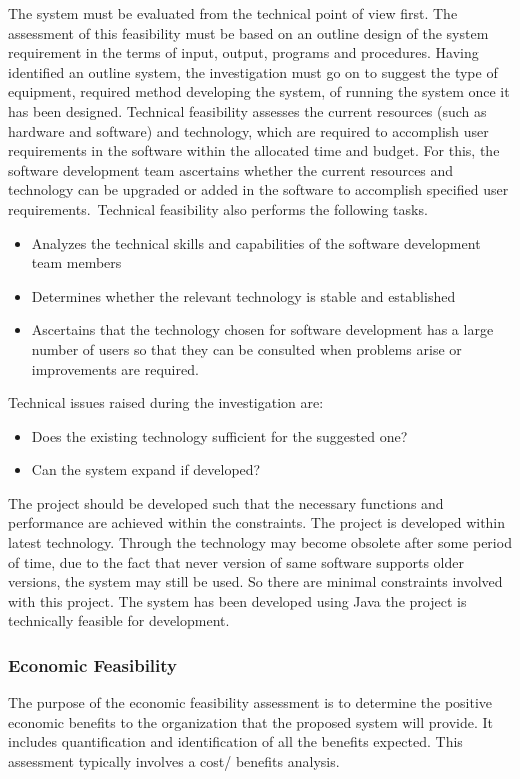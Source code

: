 The system must be evaluated from the technical point of view first. The assessment of this feasibility must be based on an outline design of the system requirement in the terms of input, output, programs and procedures. Having identified an outline system, the investigation must go on to suggest the type of equipment, required method developing the system, of running the system once it has been designed. Technical feasibility assesses the current resources (such as hardware and software) and technology, which are required to accomplish user requirements in the software within the allocated time and budget. For this, the software development team ascertains whether the current resources and technology can be upgraded or added in the software to accomplish specified user requirements. Technical feasibility also performs the following tasks.

\begin{itemize}
	\item Analyzes the technical skills and capabilities of the software development team members
	\item Determines whether the relevant technology is stable and established
	\item Ascertains that the technology chosen for software development has a large number of users so that they can be consulted when problems arise or improvements are required.
\end{itemize}

Technical issues raised during the investigation are:
\begin{itemize}
	\item Does the existing technology sufficient for the suggested one?
	\item Can the system expand if developed?
\end{itemize}

The project should be developed such that the necessary functions and performance are achieved within the constraints. The project is developed within latest technology. Through the technology may become obsolete after some period of time, due to the fact that never version of same software supports older versions, the system may still be used. So there are minimal constraints involved with this project. The system has been developed using Java the project is technically feasible for development.

\subsubsection{Economic Feasibility}
The purpose of the economic feasibility assessment is to determine the positive economic benefits to the organization that the proposed system will provide. It includes quantification and identification of all the benefits expected. This assessment typically involves a cost/ benefits analysis.

